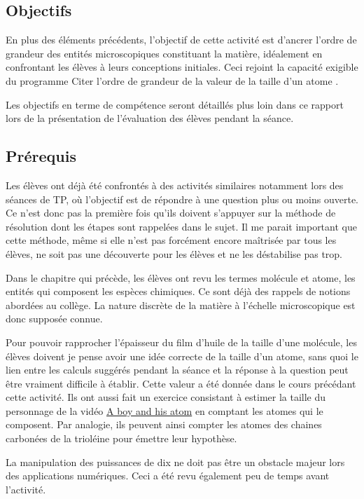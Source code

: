 \documentclass[12pt,a4paper, fleqn]{report}
\begin{document}
\subsection{Objectifs}

En plus des éléments précédents, l'objectif de cette activité est d'ancrer l'ordre de grandeur des entités microscopiques constituant la matière, idéalement en confrontant les élèves à leurs conceptions initiales.
Ceci rejoint la capacité exigible du programme \og Citer l'ordre de grandeur de la valeur de la taille d'un atome \fg{}.

Les objectifs en terme de compétence seront détaillés plus loin dans ce rapport lors de la présentation de l'évaluation des élèves pendant la séance.

\subsection{Prérequis}

Les élèves ont déjà été confrontés à des activités similaires notamment lors des séances de TP, où l'objectif est de répondre à une question plus ou moins ouverte.
Ce n'est donc pas la première fois qu'ils doivent s'appuyer sur la méthode de résolution dont les étapes sont rappelées dans le sujet.
Il me parait important que cette méthode, même si elle n'est pas forcément encore maîtrisée par tous les élèves, ne soit pas une découverte pour les élèves et ne les déstabilise pas trop.

Dans le chapitre qui précède, les élèves ont revu les termes molécule et atome, les entités qui composent les espèces chimiques.
Ce sont déjà des rappels de notions abordées au collège.
La nature discrète de la matière à l'échelle microscopique est donc supposée connue.

Pour pouvoir rapprocher l'épaisseur du film d'huile de la taille d'une molécule, les élèves doivent je pense avoir une idée correcte de la taille d'un atome, sans quoi le lien entre les calculs suggérés pendant la séance et la réponse à la question peut être vraiment difficile à établir.
Cette valeur a été donnée dans le cours précédant cette activité.
Ils ont aussi fait un exercice consistant à estimer la taille du personnage de la vidéo \href{https://youtu.be/oSCX78-8-q0}{A boy and his atom} en comptant les \og atomes \fg{} qui le composent.
Par analogie, ils peuvent ainsi compter les atomes des chaines carbonées de la trioléine pour émettre leur hypothèse.

La manipulation des puissances de dix ne doit pas être un obstacle majeur lors des applications numériques.
Ceci a été revu également peu de temps avant l'activité.
\end{document}
